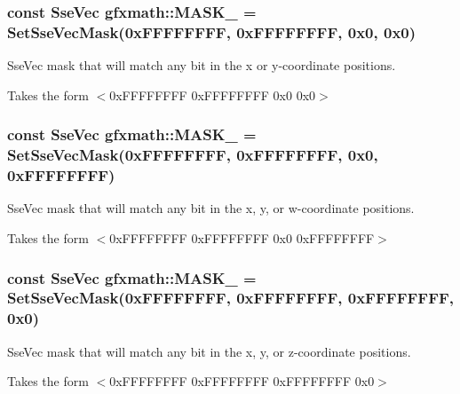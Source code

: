 \subsubsection[{M\+A\+S\+K\+\_\+1100}]{\setlength{\rightskip}{0pt plus 5cm}const {\bf Sse\+Vec} gfxmath\+::\+M\+A\+S\+K\+\_ = {\bf Set\+Sse\+Vec\+Mask}(0x\+F\+F\+F\+F\+F\+F\+F\+F, 0x\+F\+F\+F\+F\+F\+F\+F\+F, 0x0, 0x0)}\label{namespacegfxmath_aa0a06e585eb58938ab3952d53c917737}


Sse\+Vec mask that will match any bit in the x or y-\/coordinate positions. 

Takes the form $<$0x\+F\+F\+F\+F\+F\+F\+F\+F 0x\+F\+F\+F\+F\+F\+F\+F\+F 0x0 0x0$>$ \hypertarget{namespacegfxmath_a4116006bc68366e5d806a971fe6a3706}{}
\subsubsection[{M\+A\+S\+K\+\_\+1101}]{\setlength{\rightskip}{0pt plus 5cm}const {\bf Sse\+Vec} gfxmath\+::\+M\+A\+S\+K\+\_ = {\bf Set\+Sse\+Vec\+Mask}(0x\+F\+F\+F\+F\+F\+F\+F\+F, 0x\+F\+F\+F\+F\+F\+F\+F\+F, 0x0, 0x\+F\+F\+F\+F\+F\+F\+F\+F)}\label{namespacegfxmath_a4116006bc68366e5d806a971fe6a3706}


Sse\+Vec mask that will match any bit in the x, y, or w-\/coordinate positions. 

Takes the form $<$0x\+F\+F\+F\+F\+F\+F\+F\+F 0x\+F\+F\+F\+F\+F\+F\+F\+F 0x0 0x\+F\+F\+F\+F\+F\+F\+F\+F$>$ \hypertarget{namespacegfxmath_a9aed12c2814b84ca35d5d256596bf68e}{}
\subsubsection[{M\+A\+S\+K\+\_\+1110}]{\setlength{\rightskip}{0pt plus 5cm}const {\bf Sse\+Vec} gfxmath\+::\+M\+A\+S\+K\+\_ = {\bf Set\+Sse\+Vec\+Mask}(0x\+F\+F\+F\+F\+F\+F\+F\+F, 0x\+F\+F\+F\+F\+F\+F\+F\+F, 0x\+F\+F\+F\+F\+F\+F\+F\+F, 0x0)}\label{namespacegfxmath_a9aed12c2814b84ca35d5d256596bf68e}


Sse\+Vec mask that will match any bit in the x, y, or z-\/coordinate positions. 

Takes the form $<$0x\+F\+F\+F\+F\+F\+F\+F\+F 0x\+F\+F\+F\+F\+F\+F\+F\+F 0x\+F\+F\+F\+F\+F\+F\+F\+F 0x0$>$ \hypertarget{namespacegfxmath_a3438c32cb667015ef36e073223840f2a}{}
